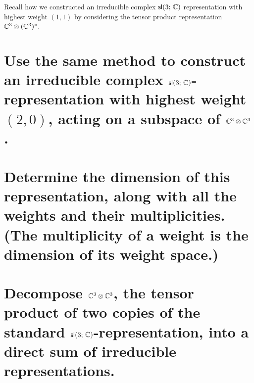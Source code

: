 \documentclass[
	pages,
	boxes,
	color=WildStrawberry
]{homework}
\begin{document}
\begin{problem}
Recall how we constructed an irreducible complex $\mathsf{sl}(3;\, \mathbb{C})$ representation with highest weight $(1, 1)$ by considering the tensor product representation $\mathbb{C}^3 \otimes (\mathbb{C}^3)^*$.
\begin{parts}
	\part{Use the same method to construct an irreducible complex $\mathsf{sl}(3;\, \mathbb{C})$-representation with highest weight $(2, 0)$, acting on a subspace of $\mathbb{C}^3 \otimes \mathbb{C}^3$.}\label{part:2a}
	\part{Determine the dimension of this representation, along with all the weights and their multiplicities. (The multiplicity of a weight is the dimension of its weight space.)}\label{part:2b}
	\part{Decompose $\mathbb{C}^3 \otimes \mathbb{C}^3$, the tensor product of two copies of the standard $\mathsf{sl}(3;\, \mathbb{C})$-representation, into a direct sum of irreducible representations.}\label{part:2c}
\end{parts}
\end{problem}
\end{document}
